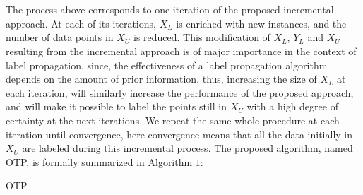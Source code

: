 \documentclass[conference]{IEEEtran}
\begin{document}
\\
\\ The process above corresponds to one iteration of the proposed incremental approach. At each of its iterations, $X_L$ is enriched with new instances, and the number of data points in $X_U$ is reduced. This modification of $X_L$, $Y_L$ and $X_U$ resulting from the incremental approach is of major importance in the context of label propagation, since, the effectiveness of a label propagation algorithm depends on the amount of prior information, thus,  increasing the size of $X_L$ at each iteration, will similarly increase the performance of the proposed approach, and will make it possible to label the points still in $X_U$ with a high degree of certainty at the next iterations. We repeat the same whole procedure at each iteration until convergence, here convergence means that all the data initially in $X_U$ are labeled during this incremental process. The proposed algorithm, named OTP, is formally summarized in Algorithm $1$:
\begin{algorithm}\label{OTP}
\caption{OTP}
\Parameters{$\varepsilon, \alpha $}
\end{algorithm}
\end{document}
